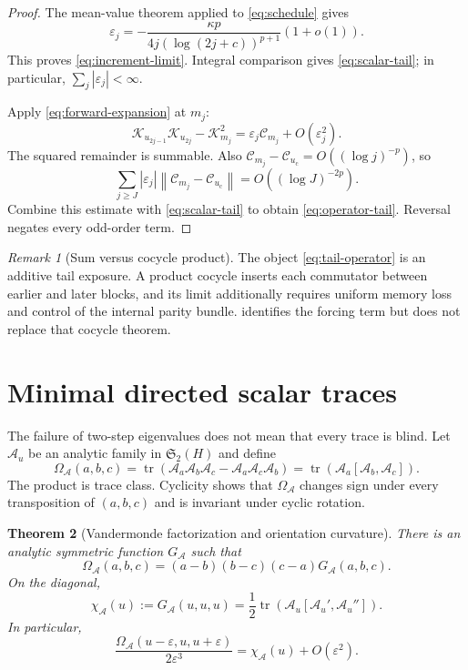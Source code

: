 \documentclass[11pt]{article}
\newtheorem{theorem}{Theorem}[section]
\theoremstyle{definition}
\theoremstyle{remark}
\newtheorem{remark}[theorem]{Remark}
\newcommand{\cK}{\mathcal K}
\newcommand{\cA}{\mathcal A}
\newcommand{\cC}{\mathcal C}
\newcommand{\uc}{u_{\mathrm c}}
\newcommand{\tr}{\operatorname{tr}}
\newcommand{\norm}[1]{\left\lVert #1\right\rVert}
\begin{document}
\begin{proof}
The mean-value theorem applied to \eqref{eq:schedule} gives
\[
 \varepsilon_j
 =-\frac{\kappa p}{4j(\log(2j+c))^{p+1}}(1+o(1)).
\]
This proves \eqref{eq:increment-limit}.  Integral comparison gives
\eqref{eq:scalar-tail}; in particular, $\sum_j|\varepsilon_j|<\infty$.

Apply \eqref{eq:forward-expansion} at $m_j$:
\[
 \cK_{u_{2j-1}}\cK_{u_{2j}}-\cK_{m_j}^2
 =\varepsilon_j\cC_{m_j}+O(\varepsilon_j^2).
\]
The squared remainder is summable.  Also
$\cC_{m_j}-\cC_{\uc}=O((\log j)^{-p})$, so
\[
 \sum_{j\ge J}|\varepsilon_j|
 \norm{\cC_{m_j}-\cC_{\uc}}
 =O((\log J)^{-2p}).
\]
Combine this estimate with \eqref{eq:scalar-tail} to obtain
\eqref{eq:operator-tail}.  Reversal negates every odd-order term.
\end{proof}

\begin{remark}[Sum versus cocycle product]
\label{rem:sum-product}
The object \eqref{eq:tail-operator} is an additive tail exposure.  A product
cocycle inserts each commutator between earlier and later blocks, and its
limit additionally requires uniform memory loss and control of the internal
parity bundle.   identifies the forcing term but does not
replace that cocycle theorem.
\end{remark}

\section{Minimal directed scalar traces}
\label{sec:directed}

The failure of two-step eigenvalues does not mean that every trace is blind.
Let $\cA_u$ be an analytic family in $\mathfrak S_2(H)$ and define
\begin{equation}\label{eq:omega}
 \Omega_{\cA}(a,b,c)
 =\tr\left(\cA_a\cA_b\cA_c-\cA_a\cA_c\cA_b\right)
 =\tr\left(\cA_a[\cA_b,\cA_c]\right).
\end{equation}
The product is trace class.  Cyclicity shows that $\Omega_{\cA}$ changes sign
under every transposition of $(a,b,c)$ and is invariant under cyclic rotation.

\begin{theorem}[Vandermonde factorization and orientation curvature]
\label{thm:vandermonde}
There is an analytic symmetric function $G_{\cA}$ such that
\begin{equation}\label{eq:vandermonde-factor}
 \Omega_{\cA}(a,b,c)
 =(a-b)(b-c)(c-a)G_{\cA}(a,b,c).
\end{equation}
On the diagonal,
\begin{equation}\label{eq:curvature}
 \chi_{\cA}(u):=G_{\cA}(u,u,u)
 =\frac12\tr\left(\cA_u[\cA_u',\cA_u'']\right).
\end{equation}
In particular,
\begin{equation}\label{eq:symmetric-curvature}
 \frac{\Omega_{\cA}(u-\varepsilon,u,u+\varepsilon)}
 {2\varepsilon^3}
 =\chi_{\cA}(u)+O(\varepsilon^2).
\end{equation}
\end{theorem}
\end{document}
